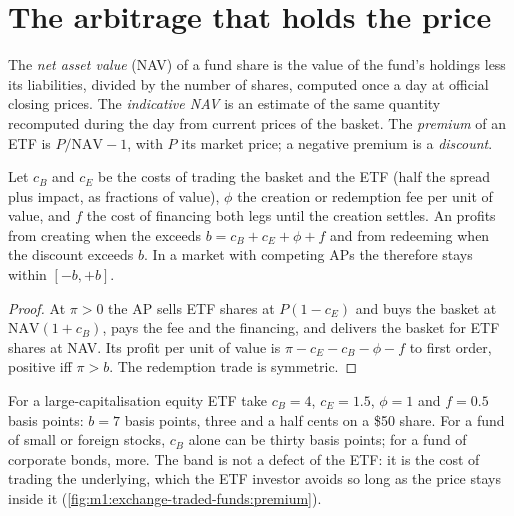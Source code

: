 \section{The arbitrage that holds the price}

\begin{definition}\label{def:m1:exchange-traded-funds:nav}
The \emph{net asset value} (NAV) of a fund share is
the value of the fund's holdings less its liabilities, divided by the number
of shares, computed once a day at official closing prices. The
\emph{indicative NAV} is an estimate of the same
quantity recomputed during the day from current prices of the basket. The
\emph{premium} of an ETF is $P/\mathrm{NAV} - 1$, with $P$ its
market price; a negative premium is a \emph{discount}.
\end{definition}

\begin{proposition}\label{prop:m1:exchange-traded-funds:band}
Let $c_B$ and $c_E$ be the costs of trading the basket and the ETF (half the
spread plus impact, as fractions of value), $\phi$ the creation or redemption
fee per unit of value, and $f$ the cost of financing both legs until the
creation settles. An  profits from creating when the
 exceeds $b = c_B + c_E + \phi + f$ and from redeeming when the
discount exceeds $b$. In a market with competing APs the  therefore
stays within $[-b, +b]$.
\end{proposition}
\begin{proof}
At  $\pi > 0$ the AP sells ETF shares at $P(1 - c_E)$ and buys the
basket at $\mathrm{NAV}(1 + c_B)$, pays the fee and the financing, and
delivers the basket for ETF shares at NAV. Its profit per unit of value is
$\pi - c_E - c_B - \phi - f$ to first order, positive iff $\pi > b$. The
redemption trade is symmetric.
\end{proof}

\begin{example}\label{ex:m1:exchange-traded-funds:band}
For a large-capitalisation equity ETF take $c_B = 4$, $c_E = 1.5$, $\phi = 1$
and $f = 0.5$ basis points: $b = 7$ basis points, three and a half cents on a
\$50 share. For a fund of small or foreign stocks, $c_B$ alone can be thirty
basis points; for a fund of corporate bonds, more. The band is not a defect
of the ETF: it is the cost of trading the underlying, which the ETF investor
avoids so long as the price stays inside it
(\cref{fig:m1:exchange-traded-funds:premium}).
\end{example}

